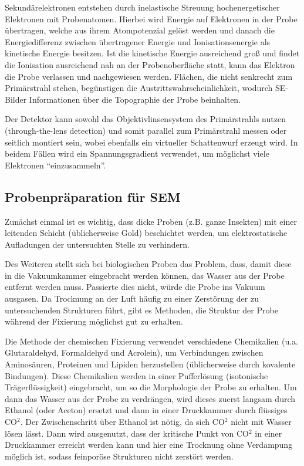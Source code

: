 Sekundärelektronen entstehen durch inelastische Streuung hochenergetischer Elektronen mit Probenatomen.
Hierbei wird Energie auf Elektronen in der Probe übertragen, welche aus ihrem Atompotenzial gelöst werden und danach die Energiedifferenz zwischen übertragener Energie und Ionisationsenergie als kinetische Energie besitzen.
Ist die kinetische Energie ausreichend groß und findet die Ionisation ausreichend nah an der Probenoberfläche statt, kann das Elektron die Probe verlassen und nachgewiesen werden. %
Flächen, die nicht senkrecht zum Primärstrahl stehen, begünstigen die Austrittswahrscheinlichkeit, wodurch SE-Bilder Informationen über die Topographie der Probe beinhalten.

Der Detektor kann sowohl das Objektivlinsensystem des Primärstrahls nutzen (through-the-lens detection) und somit parallel zum Primärstrahl messen oder seitlich montiert sein, wobei ebenfalls ein virtueller Schattenwurf erzeugt wird. \cite{springer-handbook}
In beidem Fällen wird ein Spannungsgradient verwendet, um möglichst viele Elektronen \enquote{einzusammeln}.

\subsection{Probenpräparation für SEM}

Zunächst einmal ist es wichtig, dass dicke Proben (z.B. ganze Insekten) mit einer leitenden Schicht (üblicherweise Gold) beschichtet werden, um elektrostatische Aufladungen der untersuchten Stelle zu verhindern.

Des Weiteren stellt sich bei biologischen Proben das Problem, dass, damit diese in die Vakuumkammer eingebracht werden können, das Wasser aus der Probe entfernt werden muss.
Passierte dies nicht, würde die Probe ins Vakuum ausgasen.
Da Trocknung an der Luft häufig zu einer Zerstörung der zu untersuchenden Strukturen führt, gibt es Methoden, die Struktur der Probe während der Fixierung möglichst gut zu erhalten.

Die Methode der chemischen Fixierung verwendet verschiedene Chemikalien (u.a. Glutaraldehyd, Formaldehyd und Acrolein), um Verbindungen zwischen Aminosäuren, Proteinen und Lipiden herzustellen (üblicherweise durch kovalente Bindungen). \cite{bitesize}
Diese Chemikalien werden in einer Pufferlösung (isotonische Trägerflüssigkeit) eingebracht, um so die Morphologie der Probe zu erhalten.
Um dann das Wasser aus der Probe zu verdrängen, wird dieses zuerst langsam durch Ethanol (oder Aceton) ersetzt und dann in einer Druckkammer durch flüssiges CO$^2$.
Der Zwischenschritt über Ethanol ist nötig, da sich CO$^2$ nicht mit Wasser lösen lässt.
Dann wird ausgenutzt, dass der kritische Punkt von CO$^2$ in einer Druckkammer erreicht werden kann und hier eine Trocknung ohne Verdampung möglich ist, sodass feinporöse Strukturen nicht zerstört werden.

